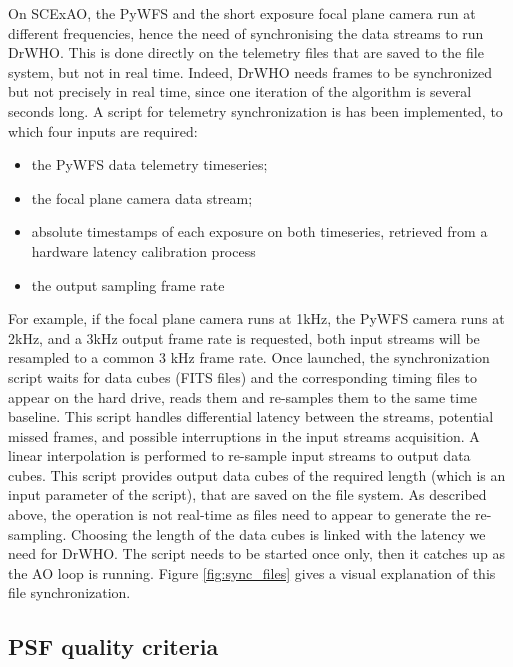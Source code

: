 \documentclass[twocolumn]{aa}
\begin{document}
On SCExAO, the PyWFS and the short exposure focal plane camera run at different frequencies, hence the need of synchronising the data streams to run DrWHO. 
This is done directly on the telemetry files that are saved to the file system, but not in real time. Indeed, DrWHO needs frames to be synchronized but not precisely in real time, since one iteration of the algorithm is several seconds long. 
A script for telemetry synchronization is has been implemented, to which four inputs are required: 
\begin{itemize}
    \item the PyWFS data telemetry timeseries;
    \item the focal plane camera data stream;
    \item absolute timestamps of each exposure on both timeseries, retrieved from a hardware latency calibration process 
    \item the output sampling frame rate
\end{itemize}

For example, if the focal plane camera runs at 1kHz, the PyWFS camera runs at 2kHz, and a 3kHz output frame rate is requested, both input streams will be resampled to a common 3 kHz frame rate. Once launched, the synchronization script waits for data cubes (FITS files) and the corresponding timing files to appear on the hard drive, reads them and re-samples them to the same time baseline. This script handles differential latency between the streams, potential missed frames, and possible interruptions in the input streams acquisition. A linear interpolation is performed to re-sample input streams to output data cubes.
This script provides output data cubes of the required length (which is an input parameter of the script), that are saved on the file system. As described  above, the operation is not real-time as files need to appear to generate the re-sampling. Choosing the length of the data cubes is linked with the latency we need for DrWHO. The script needs to be started once only, then it catches up as the AO loop is running. Figure \ref{fig:sync_files} gives a visual explanation of this file synchronization.




\subsection{PSF quality criteria}
\end{document}
